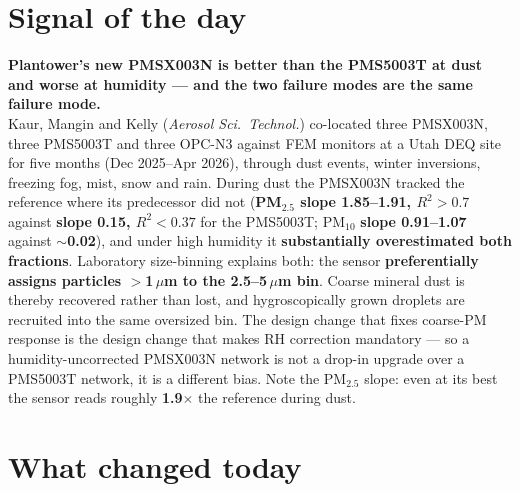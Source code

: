 \documentclass[10pt]{article}
\begin{document}
\vspace{6mm}

\section*{\sffamily\bfseries\color{Deep}Signal of the day}
\vspace{-1.5mm}{\color{Amber}\rule{\linewidth}{1.1pt}}\vspace{2.5mm}

\begin{keybox}
{\sffamily\bfseries\small\color{Deep}Plantower's new PMSX003N is better than the PMS5003T
at dust and worse at humidity --- and the two failure modes are the same failure mode.}\\[1.4mm]
\footnotesize
Kaur, Mangin and Kelly (\textit{Aerosol Sci.\ Technol.}) co-located three PMSX003N, three
PMS5003T and three OPC-N3 against FEM monitors at a Utah DEQ site for five months
(Dec 2025--Apr 2026), through dust events, winter inversions, freezing fog, mist, snow and
rain. During dust the PMSX003N tracked the reference where its predecessor did not
(\textbf{PM$_{2.5}$ slope 1.85--1.91, $R^2>0.7$} against \textbf{slope 0.15, $R^2<0.37$}
for the PMS5003T; PM$_{10}$ \textbf{slope 0.91--1.07} against \textbf{$\sim$0.02}), and
under high humidity it \textbf{substantially overestimated both fractions}. Laboratory
size-binning explains both: the sensor \textbf{preferentially assigns particles $>$1\,$\mu$m
to the 2.5--5\,$\mu$m bin}. Coarse mineral dust is thereby recovered rather than lost, and
hygroscopically grown droplets are recruited into the same oversized bin. The design change
that fixes coarse-PM response is the design change that makes RH correction mandatory ---
so a humidity-uncorrected PMSX003N network is not a drop-in upgrade over a PMS5003T
network, it is a different bias. Note the PM$_{2.5}$ slope: even at its best the sensor
reads roughly \textbf{1.9$\times$} the reference during dust.
\end{keybox}

\vspace{3mm}

\section*{\sffamily\bfseries\color{Deep}What changed today}
\vspace{-1.5mm}{\color{Amber}\rule{\linewidth}{1.1pt}}\vspace{2.5mm}
\end{document}
